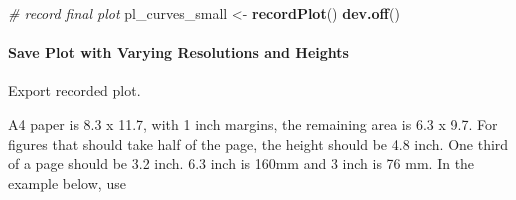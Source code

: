 \documentclass[
]{book}
\newenvironment{Shaded}{\begin{snugshade}}{\end{snugshade}}
\newcommand{\CommentTok}[1]{\textcolor[rgb]{0.56,0.35,0.01}{\textit{#1}}}
\newcommand{\KeywordTok}[1]{\textcolor[rgb]{0.13,0.29,0.53}{\textbf{#1}}}
\newcommand{\NormalTok}[1]{#1}
\newcommand{\StringTok}[1]{\textcolor[rgb]{0.31,0.60,0.02}{#1}}
\begin{document}
\begin{Shaded}
\begin{Highlighting}[]
\CommentTok{\# record final plot}
\NormalTok{pl\_curves\_small \textless{}{-}}\StringTok{ }\KeywordTok{recordPlot}\NormalTok{()}
\KeywordTok{dev.off}\NormalTok{()}
\end{Highlighting}
\end{Shaded}

\hypertarget{save-plot-with-varying-resolutions-and-heights}{%
\paragraph{Save Plot with Varying Resolutions and Heights}\label{save-plot-with-varying-resolutions-and-heights}}

Export recorded plot.

A4 paper is 8.3 x 11.7, with 1 inch margins, the remaining area is 6.3 x 9.7. For figures that should take half of the page, the height should be 4.8 inch. One third of a page should be 3.2 inch. 6.3 inch is 160mm and 3 inch is 76 mm. In the example below, use
\end{document}

